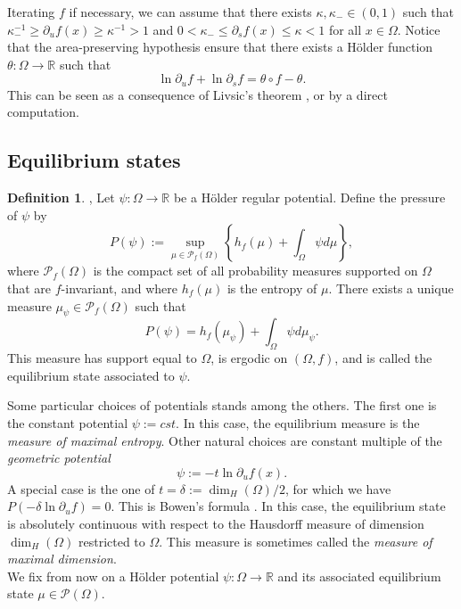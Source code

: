 \documentclass[a4paper]{article}
\theoremstyle{definition}
\newtheorem{definition}{Definition}[section]
\begin{document}
Iterating $f$ if necessary, we can assume that there exists $\kappa,\kappa_- \in (0,1)$ such that $ \kappa_-^{-1} \geq \partial_u f(x) \geq \kappa^{-1} > 1$ and $0 < \kappa_- \leq \partial_s f(x) \leq \kappa < 1$ for all $x \in \Omega$. Notice that the area-preserving hypothesis ensure that there exists a Hölder function $\theta:\Omega\rightarrow \mathbb{R}$ such that
$$ \ln \partial_u f + \ln \partial_s f = \theta \circ f - \theta .$$
This can be seen as a consequence of Livsic's theorem \cite{Liv71}, or by a direct computation.
\subsection{Equilibrium states}


\begin{definition}{\cite{Bo75}, \cite{Ru78}}
Let $\psi : \Omega \rightarrow \mathbb{R}$ be a Hölder regular potential.
Define the pressure of $\psi$ by
$$ P(\psi) := \sup_{\mu \in \mathcal{P}_f(\Omega)} \left\{ h_f(\mu) + \int_\Omega \psi d\mu \right\}, $$
where $\mathcal{P}_f(\Omega)$ is the compact set of all probability measures supported on $\Omega$ that are $f$-invariant, and where $h_f(\mu)$ is the entropy of $\mu$. There exists a unique measure $\mu_\psi \in \mathcal{P}_f(\Omega)$ such that $$ P(\psi) = h_f(\mu_\psi) + \int_\Omega \psi d\mu_\psi .$$
This measure has support equal to $\Omega$, is ergodic on $(\Omega,f)$, and is called the equilibrium state associated to $\psi$.


\end{definition}

Some particular choices of potentials stands among the others. The first one is the constant potential $\psi := cst$. In this case, the equilibrium measure is the \emph{measure of maximal entropy}. Other natural choices are constant multiple of the \emph{geometric potential} $$ \psi := - t \ln \partial_u f(x). $$
A special case is the one of $t = \delta :=\dim_H(\Omega)/2$, for which we have $P(- \delta \ln \partial_u f)=0$. This is Bowen's formula \cite{Bo79,McM83}. In this case, the equilibrium state is absolutely continuous with respect to the Hausdorff measure of dimension $\dim_H(\Omega)$ restricted to $\Omega$. This measure is sometimes called the \emph{measure of maximal dimension}.\\


We fix from now on a Hölder potential $\psi:\Omega \rightarrow \mathbb{R}$ and its associated equilibrium state $\mu \in \mathcal{P}(\Omega)$.
\end{document}
